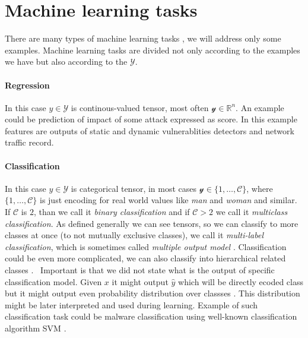 

\section{Machine learning tasks}
There are many types of machine learning tasks \citet{GoodBengCour16}, we will address only some examples. Machine learning tasks are divided not only according to the examples we have but also according to the $\mathcal{Y}$.

\paragraph{Regression}
In this case $y \in \mathcal{Y}$ is continous-valued tensor, most often $\mathcal{y} \in \mathbb{R}^{n}$. An example could be prediction of impact of some attack expressed as score. In this example features are outputs of static and dynamic vulnerablities detectors and network traffic record. \cite{Jaganathan2015}

\paragraph{Classification}
In this case $y \in \mathcal{Y}$ is categorical tensor, in most cases $\mathcal{y} \in \{1,\dots,\mathcal{C}\}$, where $\{1,\dots,\mathcal{C}\}$ is just encoding for real world values like \emph{man} and \emph{woman} and similar. If $\mathcal{C}$ is $2$, than we call it \emph{binary classification} and if $\mathcal{C}>2$ we call it \emph{multiclass classification}. As defined generally we can see tensors, so we can classify to more classes at once (to not mutually exclusive classes), we call it \emph{multi-label classification}, which is sometimes called \emph{multiple output model} \cite{murphy2013machine}. Classification could be even more complicated, we can also classify into hierarchical related classes \cite{zhang2020dive}. \
Important is that we did not state what is the output of specific classification model. Given $x$ it might output $\hat{y}$ which will be directly ecoded class but it might output even probability distribution over classses \cite{GoodBengCour16}. This distribution might be later interpreted and used during learning.
Example of such classification task could be malware classification using well-known classification algorithm SVM \cite{Kruczkowski2014}.


